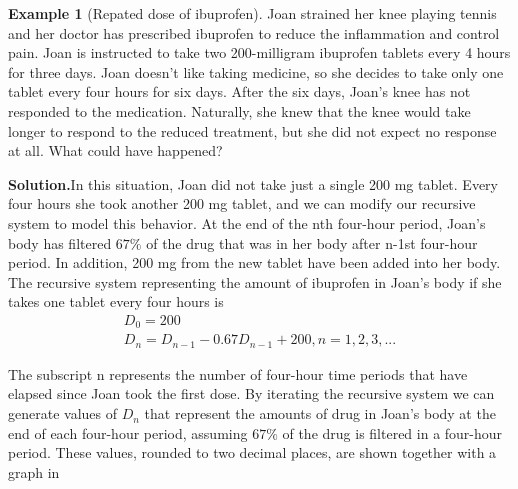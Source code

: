 \documentclass[10pt,]{book}
\theoremstyle{plain}
\theoremstyle{definition}
\theoremstyle{definition}
\newtheorem{example}[theorem]{Example}
\theoremstyle{definition}
\numberwithin{equation}{section}
\newlength{\panelmax}
\begin{document}
\begin{example}[Repated dose of ibuprofen]\label{example-2}
Joan strained her knee playing tennis and her doctor has prescribed ibuprofen to reduce the inflammation and control pain.  Joan is instructed to take two 200-milligram ibuprofen tablets every 4 hours for three days.  Joan doesn’t like taking medicine, so she decides to take only one tablet every four hours for six days.  After the six days, Joan’s knee has not responded to the medication.  Naturally, she knew that the knee would take longer to respond to the reduced treatment, but she did not expect no response at all.  What could have happened?%
\par\medskip\noindent%
\textbf{Solution.}\quad In this situation, Joan did not take just a single 200 mg tablet.  Every four hours she took another 200 mg tablet, and we can modify our recursive system to model this behavior. At the end of the nth four-hour period, Joan’s body has filtered \(67\%\) of the drug that was in her body after n-1st  four-hour period.  In addition, 200 mg from the new tablet have been added into her body.  The recursive system representing the amount of ibuprofen in Joan’s body if she takes one tablet every four hours is%
%
\begin{gather*}
D_0=200\\
D_n=D_{n-1} - 0.67D_{n-1} + 200, n=1,2,3,...
\end{gather*}
\par
The subscript n represents the number of four-hour time periods that have elapsed since Joan took the first dose.  By iterating the recursive system we can generate values of \(D_n\) that represent the amounts of drug in Joan’s body at the end of each four-hour period, assuming  \(67\%\) of the drug is filtered in a four-hour period.  These values, rounded to two decimal places, are shown together with a graph in \hyperref[figure-plot-ibuprofen-multi-dose]{}%
{%
\setlength{\panelmax}{0pt}
\newsavebox{\panelboxCimage}
}
\end{example}
\end{document}
